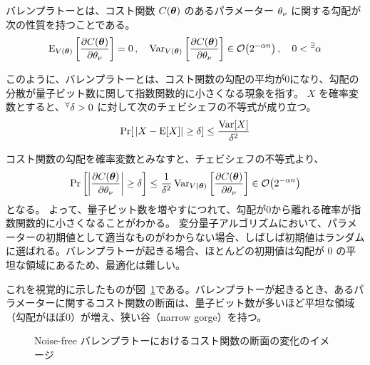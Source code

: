 \begin{screen}
    \begin{definition}\label{def:bp}
        バレンプラトーとは、コスト関数 $C(\boldsymbol{\theta})$ のあるパラメーター $\theta_\nu$ に関する勾配が次の性質を持つことである\cite{mcclean2018barren}。
        \begin{align}
            \E_{V(\bs{\th})}\qty[\pdv{C(\bs{\th})}{\th_\nu}] = 0\,, \quad \Var_{V(\bs{\th})}\qty[\pdv{C(\bs{\th})}{\th_\nu}] \in \order{2^{-\alpha n}}\,, \quad 0 < \ex \alpha
        \end{align}
    \end{definition}
\end{screen}

このように、バレンプラトーとは、コスト関数の勾配の平均が0になり、勾配の分散が量子ビット数に関して指数関数的に小さくなる現象を指す。
$X$ を確率変数とすると、${}^\forall\delta > 0$ に対して次のチェビシェフの不等式が成り立つ。
\begin{align}
    \Pr[\,|X - \operatorname{E}[X]| \geq \delta] \leq \frac{\operatorname{Var}[X]}{\delta^2}
\end{align}

コスト関数の勾配を確率変数とみなすと、チェビシェフの不等式より、
\begin{align}
    \Pr\qty[\abs{\pdv{C(\bs{\th})}{\th_\nu}} \geq \delta]
    \leq \frac{1}{\delta^2}\Var_{V(\bs{\th})}\qty[\pdv{C(\bs{\th})}{\th_\nu}] \in \order{2^{-\alpha n}}
\end{align}
となる。
よって、量子ビット数を増やすにつれて、勾配が0から離れる確率が指数関数的に小さくなることがわかる。
変分量子アルゴリズムにおいて、パラメーターの初期値として適当なものがわからない場合、しばしば初期値はランダムに選ばれる。バレンプラトーが起きる場合、ほとんどの初期値は勾配が $0$ の平坦な領域にあるため、最適化は難しい。

これを視覚的に示したものが図~\ref{fig:bp-cost-1}である。バレンプラトーが起きるとき、あるパラメーターに関するコスト関数の断面は、量子ビット数が多いほど平坦な領域（勾配がほぼ0）が増え、狭い谷（narrow gorge）を持つ\cite{arrasmith2022equivalence}。

\begin{figure}[H]
    \centering
    \caption{Noise-free バレンプラトーにおけるコスト関数の断面の変化のイメージ}
    \label{fig:bp-cost-1}
\end{figure}

